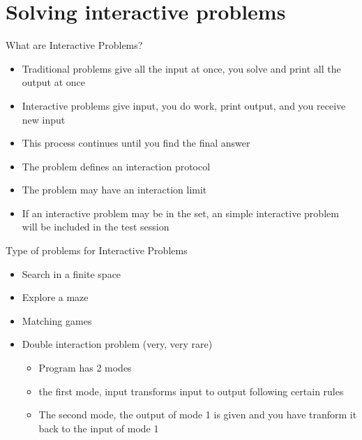 \documentclass[11pt,pdf, aspectratio=169]{beamer}
\begin{document}
  \section{Solving interactive problems}
  \begin{frame}{What are Interactive Problems?}
    \begin{itemize}
      \item Traditional problems give all the input at once, you solve and print all the output at once
      \item Interactive problems give input, you do work, print output, and you receive new input
      \item This process continues until you find the final answer
      \item The problem defines an interaction protocol
      \item The problem may have an interaction limit
      \item If an interactive problem may be in the set, an simple interactive problem will be included in the test session
    \end{itemize}
  \end{frame}
  \begin{frame}{Type of problems for Interactive Problems}
    \begin{itemize}
      \item Search in a finite space
      \item Explore a maze
      \item Matching games
      \item Double interaction problem (very, very rare)
      \begin{itemize}
        \item Program has 2 modes
        \item the first mode, input transforms input to output following certain rules
        \item The second mode, the output of mode 1 is given and you have tranform it back to the input of mode 1
      \end{itemize}
    \end{itemize}
  \end{frame}
\end{document}
